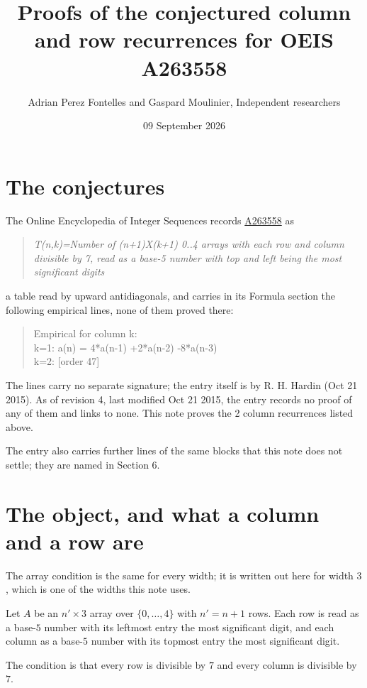 \documentclass[11pt]{article}
\title{Proofs of the conjectured column and row recurrences for OEIS A263558}
\author{Adrian Perez Fontelles and Gaspard Moulinier, Independent researchers}
\date{09 September 2026}
\theoremstyle{definition}
\begin{document}
\maketitle
\section{The conjectures}

The Online Encyclopedia of Integer Sequences records \href{https://oeis.org/A263558}{A263558} as

\begin{quote}\itshape T(n,k)=Number of (n+1)X(k+1) 0..4 arrays with each row and column divisible by 7, read as a base-5 number with top and left being the most significant digits\end{quote}

a table read by upward antidiagonals, and carries in its Formula section the following empirical lines, none of them proved there:

\begin{quote}\ttfamily Empirical for column k:\\
k=1: a(n) = 4*a(n-1) +2*a(n-2) -8*a(n-3)\\k=2: [order 47]\end{quote}

The lines carry no separate signature; the entry itself is by R. H. Hardin (Oct 21 2015). As of revision 4, last modified Oct 21 2015, the entry records no proof of any of them and links to none. This note proves the 2 column recurrences listed above.

The entry also carries further lines of the same blocks that this note does not settle; they are named in Section 6.

\section{The object, and what a column and a row are}

The array condition is the same for every width; it is written out here for width $3$, which is one of the widths this note uses.

Let $A$ be an $n' \times 3$ array over $\{0,\dots,4\}$ with $n' = n + 1$ rows. Each row is read as a base-$5$ number with its leftmost entry the most significant digit, and each column as a base-$5$ number with its topmost entry the most significant digit.

The condition is that every row is divisible by $7$ and every column is divisible by $7$.
\end{document}
